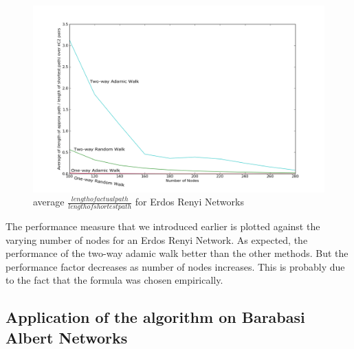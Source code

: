 \documentclass[a4paper,12pt]{article}
\begin{document}
\newpage
\begin{figure}[htp]
\centering
\includegraphics[scale=0.40]{Results/ERperformance.png}
\caption{average $\frac{length of actual path}{length of shortest path}$ for Erdos Renyi Networks}
\label{ERperformance}
\end{figure}
The performance measure that we introduced earlier is plotted against the varying number of nodes for an Erdos Renyi Network. As expected, the performance of the two-way adamic walk better than the other methods. But the performance factor decreases as number of nodes increases. This is probably due to the fact that the formula was chosen empirically.




\subsection{Application of the algorithm on Barabasi Albert Networks}
\end{document}
